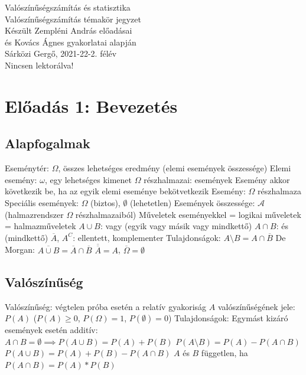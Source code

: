 \documentclass[12pt,a4paper]{article}
\begin{document}
\begin{center}
	\huge
	Valószínűségszámítás és statisztika\\
	\vspace{1mm}
	\LARGE
	Valószínűségszámítás témakör jegyzet\\
	\vspace{5mm}
	\large
	Készült Zempléni András előadásai\\
	és Kovács Ágnes gyakorlatai alapján\\
	\vspace{5mm}
	Sárközi Gergő, 2021-22-2. félév\\
	Nincsen lektorálva!
\end{center}

\tableofcontents

\pagebreak

\section{Előadás 1: Bevezetés}

\subsection{Alapfogalmak}

\begin{outline}
	\1 Eseménytér: $\Omega$, összes lehetséges eredmény (elemi események összessége)
		\2 Elemi esemény: $\omega$, egy lehetséges kimenet
		\2 $\Omega$ részhalmazai: események
		\2 Esemény akkor következik be, ha az egyik elemi eseménye bekötvetkezik
	\1 Esemény: $\Omega$ részhalmaza
		\2 Speciális események: $\Omega$ (biztos), $\emptyset$ (lehetetlen)
		\2 Események összessége: $\mathcal{A}$ (halmazrendszer $\Omega$ részhalmazaiból)
	\1 Műveletek eseményekkel = logikai műveletek = halmazműveletek
		\2 $A \cup B$: vagy (egyik vagy másik vagy mindkettő)
		\2 $A \cap B$: és (mindkettő)
		\2 $\overline{A}$, $A^C$: ellentett, komplementer
	\1 Tulajdonságok:
		\2 $A \setminus B = A \cap \overline{B}$
		\2 De Morgan: $\overline{A \cup B} = \overline{A} \cap \overline{B}$
		\2 $\overline{\overline{A}} = A$, $\overline{\Omega} = \emptyset$
\end{outline}

\pagebreak

\subsection{Valószínűség}

\begin{outline}
	\1 Valószínűség: végtelen próba esetén a relatív gyakoriság
	\1 $A$ valószínűségének jele: $P(A)$ \; ($P(A) \ge 0$, $P(\Omega) = 1$, $P(\emptyset) = 0$)
	\1 Tulajdonságok:
		\2 Egymást kizáró események esetén additív:\\
		$A \cap B = \emptyset \implies P(A \cup B) = P(A) + P(B)$
		\2 $P(A \setminus B) = P(A) - P(A \cap B)$
		\2 $P(A \cup B) = P(A) + P(B) - P(A \cap B)$
	\1 $A$ és $B$ független, ha $P(A \cap B) = P(A) * P(B)$
\end{outline}
\end{document}
